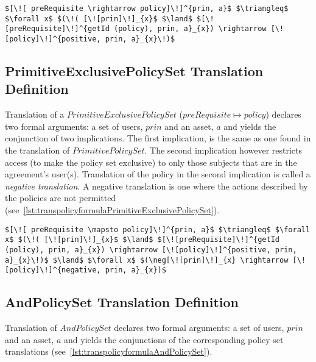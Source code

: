 \lstset{mathescape, language=AST}  
\begin{lstlisting}[frame=single, caption={Policy Set Translation Definition {$\colon$} PrimitivePolicySet},label={lst:transpolicyformulaPrimitivePolicySet}]
$[\![ preRequisite \rightarrow policy]\!]^{prin, a}$ $\triangleq$ $\forall x$ $(\!( [\![prin]\!]_{x}$ $\land$ $[\![preRequisite]\!]^{getId (policy), prin, a}_{x}) \rightarrow [\![policy]\!]^{positive, prin, a}_{x}\!)$
\end{lstlisting}





\subsection{PrimitiveExclusivePolicySet Translation Definition}
Translation of a $PrimitiveExclusivePolicySet$ ($preRequisite \mapsto policy$) declares two formal arguments: a set of users, $prin$ and an asset, $a$ and yields the conjunction of two implications. The first implication, is the same as one found in the translation of $PrimitivePolicySet$. The second implication however restricts access (to make the policy set exclusive) to only those subjects that are in the agreement's user(s). Translation of the policy in the second implication is called a \emph{negative translation}. A negative translation is one where the actions described by the policies are not permitted (see~\ref{lst:transpolicyformulaPrimitiveExclusivePolicySet}).


\lstset{mathescape, language=AST}  
\begin{lstlisting}[frame=single, caption={Policy Set Translation Definition {$\colon$} PrimitiveExclusivePolicySet},label={lst:transpolicyformulaPrimitiveExclusivePolicySet}]
$[\![ preRequisite \mapsto policy]\!]^{prin, a}$ $\triangleq$ $\forall x$ $(\!( [\![prin]\!]_{x}$ $\land$ $[\![preRequisite]\!]^{getId (policy), prin, a}_{x}) \rightarrow [\![policy]\!]^{positive, prin, a}_{x}\!)$ $\land$ $\forall x$ $(\neg[\![prin]\!]_{x} \rightarrow [\![policy]\!]^{negative, prin, a}_{x})$
\end{lstlisting}

\subsection{AndPolicySet Translation Definition}
Translation of $AndPolicySet$ declares two formal arguments: a set of users, $prin$ and an asset, $a$ and yields the conjunctions of the corresponding policy set translations (see~\ref{lst:transpolicyformulaAndPolicySet}). 

